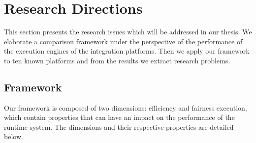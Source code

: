 \section{Research Directions}
\label{sec:survey}

\noindent 
This section presents the research issues which will be addressed in our thesis. We elaborate a comparison framework under the perspective of the performance of the execution engines of the integration platforms. Then we apply our framework to ten known platforms and from the results we extract research problems.
\subsection{{Framework}}
\label{subsec:framework}

\noindent 
Our framework is composed of two dimensions: efficiency and fairness execution, which contain properties that can have an impact on the performance of the runtime system. The dimensions and their respective properties are detailed below.

